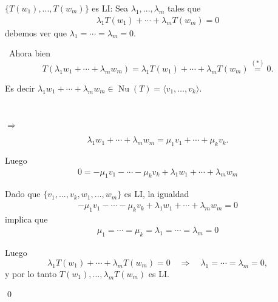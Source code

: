 \documentclass[handout]{beamer} %
\renewcommand\nu{\operatorname{Nu}}
\newcommand{\la}{\langle}
\newcommand{\ra}{\rangle}
\begin{document}
\begin{frame}
 
	\begin{block}{$\{T({w_1}), ..., T({w_m})\}$ es LI:}\pause
		Sea $\lambda_1, ..., \lambda_m$ tales que
		\begin{align*}
		\lambda_1T({w_1})+\cdots +\lambda_mT({w_m})=0 \tag{*}
		\end{align*}
		debemos ver que  $\lambda_1=\cdots=\lambda_m=0$. \pause
	
	\
	Ahora bien 
	$$
	T(\lambda_1{w_1}+\cdots +\lambda_m{w_m})=\lambda_1T({w_1})+\cdots +\lambda_mT({w_m})\stackrel{(*)}{=}0.
	$$
	\pause
	
	Es decir $\lambda_1{w_1}+\cdots +\lambda_m{w_m} \in \nu(T) = \la v_1,\dots,v_k \ra$.\pause

	\ 

	$\Rightarrow$\pause

	$$\lambda_1{w_1}+\cdots +\lambda_m{w_m} = \mu_1v_1+\cdots+\mu_kv_k.$$

		\end{block}

\end{frame}

\begin{frame}

	Luego
	\begin{align*}
		0 = -\mu_1v_1-\cdots-\mu_kv_k+\lambda_1{w_1}+\cdots +\lambda_m{w_m}
	\end{align*}

	\pause
Dado que $\{v_1, ..., v_k, {w_1}, ..., {w_m}\}$ es LI, la igualdad
\begin{align*}
-\mu_1v_1-\cdots-\mu_kv_k+\lambda_1{w_1}+\cdots +\lambda_m{w_m}=0
\end{align*}
implica que 
\begin{align*}
\mu_1=\cdots=\mu_k=\lambda_1=\cdots=\lambda_m=0
\end{align*} 

Luego 
\begin{equation*}
	\lambda_1T({w_1})+\cdots +\lambda_mT({w_m})=0 \quad \Rightarrow \quad \lambda_1=\cdots=\lambda_m=0, 
\end{equation*}
y por lo tanto  $T({w_1}),\ldots ,\lambda_mT({w_m})$ es LI. 


\qed 
\end{frame}
\end{document}
